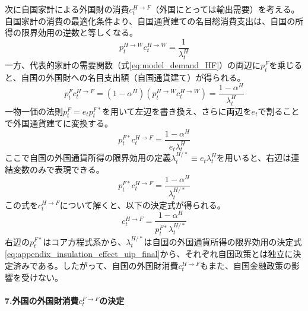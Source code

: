 次に自国家計による外国財の消費\(c_t^{H\to F}\)（外国にとっては輸出需要）を考える。
自国家計の消費の最適化条件より、自国通貨建ての名目総消費支出は、自国の所得の限界効用の逆数と等しくなる。
\begin{equation}
p_t^{H\to W}c_t^{H\to W}=\frac{1}{\lambda_t^H}
\label{eq:appendix_insulation_effect_other_chf_budget}
\end{equation}
一方、代表的家計の需要関数（式\eqref{eq:model_demand_HF}）の両辺に\(p_t^F\)を乗じると、自国の外国財への名目支出額（自国通貨建て）が得られる。
\begin{equation}
p_t^Fc_t^{H\to F}=(1-\alpha^H)(p_t^{H\to W}c_t^{H\to W})=\frac{1-\alpha^H}{\lambda_t^H}
\label{eq:appendix_insulation_effect_other_chf_nom_exp}
\end{equation}
一物一価の法則\(p_t^F=e_tp_t^{F*}\)を用いて左辺を書き換え、さらに両辺を\(e_t\)で割ることで外国通貨建てに変換する。
\begin{equation}
p_t^{F*}c_t^{H\to F}=\frac{1-\alpha^H}{e_t\lambda_t^H}
\label{eq:appendix_insulation_effect_other_chf_currency_step}
\end{equation}
ここで自国の外国通貨所得の限界効用の定義\(\lambda_t^{H/*}\equiv e_t\lambda_t^H\)を用いると、右辺は連結変数のみで表現できる。
\begin{equation}
p_t^{F*}c_t^{H\to F}=\frac{1-\alpha^H}{\lambda_t^{H/*}}
\label{eq:appendix_insulation_effect_other_chf_currency_final}
\end{equation}
この式を\(c_t^{H\to F}\)について解くと、以下の決定式が得られる。
\begin{equation}
    c_t^{H\to F}=\frac{1-\alpha^H}{p_t^{F*}\lambda_t^{H/*}}
    \label{eq:appendix_insulation_effect_other_chf_final}
\end{equation}
右辺の\(p_t^{F*}\)はコア方程式系から、\(\lambda_t^{H/*}\)は自国の外国通貨所得の限界効用の決定式\eqref{eq:appendix_insulation_effect_uip_final}から、それぞれ自国政策とは独立に決定済みである。したがって、自国の外国財消費\(c_t^{H\to F}\)もまた、自国金融政策の影響を受けない。

\paragraph{7.外国の外国財消費\(c_t^{F\to F}\)の決定}
\label{sec:appendix_insulation_effect_other_cff}

